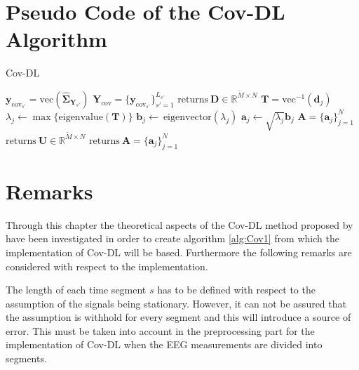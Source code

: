 


\section{Pseudo Code of the Cov-DL Algorithm}\label{seg:alg_cov}
\begin{algorithm}[H]
\caption{Cov-DL}
\begin{algorithmic}[1]
				\State$\textbf{y}_{\text{cov}_{s'}} = \text{vec}\left( \widehat{\boldsymbol{\Sigma}}_{\mathbf{Y}_{s'}} \right)$	
			\EndFor			
			\State$\textbf{Y}_{\text{cov}} = \{\textbf{y}_{\text{cov}_{s'}}\}_{s'=1}^{L_{s'}}$
			\State
			\State$\text{returns} \ \textbf{D} \in \mathbb{R}^{\widetilde{M}\times N}$
			\EndProcedure
			\State$\textbf{T} = \text{vec}^{-1}(\textbf{d}_j)$            
			\State$\lambda_j\gets \max\{\text{eigenvalue}(\textbf{T})\}$
			\State$\textbf{b}_j \gets \ \text{eigenvector}(\lambda_j)$
			\State$\textbf{a}_j \gets \sqrt{\lambda_j}\textbf{b}_j$
			\EndFor
			\State$\textbf{A} = \{\textbf{a}_j\}_{j=1}^N$
			\EndIf
			\State
				\State$\text{returns} \ \textbf{U}\in \mathbb{R}^{\widetilde{M}\times N}$
				\EndProcedure
				\State$\text{returns}\ \textbf{A}= \{\textbf{a}_j\}_{j=1}^{N}$
				\EndProcedure
			\EndIf
           \EndProcedure
        \end{algorithmic} 
        \label{alg:Cov1}
\end{algorithm}

\section{Remarks}
Through this chapter the theoretical aspects of the Cov-DL method proposed by \cite{Balkan2015} have been investigated in order to create algorithm \ref{alg:Cov1} from which the implementation of Cov-DL will be based. Furthermore the following remarks are considered with respect to the implementation.   

The length of each time segment $s$ has to be defined with respect to the assumption of the signals being stationary. However, it can not be assured that the assumption is withhold for every segment and this will introduce a source of error. 
This must be taken into account in the preprocessing part for the implementation of Cov-DL when the EEG measurements are divided into segments.

